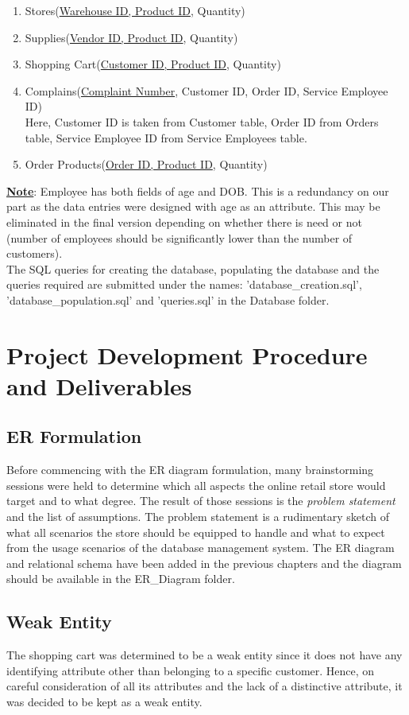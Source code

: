 \documentclass[12pt]{report}
\begin{document}
\begin{enumerate}
	\item Stores(\underline{Warehouse ID, Product ID}, Quantity)
	\item Supplies(\underline{Vendor ID, Product ID}, Quantity)
	\item Shopping Cart(\underline{Customer ID, Product ID}, Quantity)
	\item Complains(\underline{Complaint Number}, Customer ID, Order ID, Service Employee ID)\\ Here, Customer ID is taken from Customer table, Order ID from Orders table, Service Employee ID from Service Employees table.
	\item Order Products(\underline{Order ID, Product ID}, Quantity)

\end{enumerate}

\textbf{\underline{ Note}}: Employee has both fields of age and DOB. This is a redundancy on our part as the data entries were designed with age as an attribute. This may be eliminated in the final version depending on whether there is need or not (number of employees should be significantly lower than the number of customers).
\\
The SQL queries for creating the database, populating the database and the queries required are submitted under the names: 'database\_creation.sql', 'database\_population.sql' and 'queries.sql' in the Database folder.

\chapter{Project Development Procedure and Deliverables}
	\section{ER Formulation}
	Before commencing with the ER diagram formulation, many brainstorming sessions were held to determine which all aspects the online retail store would target and to what degree. The result of those sessions is the \textit{problem statement} and the list of assumptions. The problem statement is a rudimentary sketch of what all scenarios the store should be equipped to handle and what to expect from the usage scenarios of the database management system. The ER diagram and relational schema have been added in the previous chapters and the diagram should be available in the ER\_Diagram folder.
	\section{Weak Entity}
	The shopping cart was determined to be a weak entity since it does not have any identifying attribute other than belonging to a specific customer. Hence, on careful consideration of all its attributes and the lack of a distinctive attribute, it was decided to be kept as a weak entity.
\end{document}
